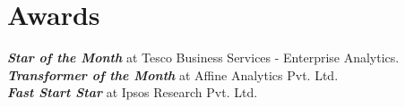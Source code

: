 \section{Awards}
  \begin{itemize}[leftmargin=0.1in, label={}]
    \normalsize{
      \item{
        \textit{\textbf{Star of the Month}} at Tesco Business Services - Enterprise Analytics. \\
        \textit{\textbf{Transformer of the Month}} at Affine Analytics Pvt. Ltd. \\
        \textit{\textbf{Fast Start Star}} at Ipsos Research Pvt. Ltd.
      }
    }
  \end{itemize}
